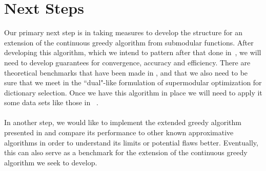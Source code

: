 \documentclass{article}
\begin{document}
\section{Next Steps}
Our primary next step is in taking measures to develop the structure for an extension of the continuous greedy algorithm from submodular functions. After developing this algorithm, which we intend to pattern after that done in~\cite{Singer16TwoStage}, we will need to develop guarantees for convergence, accuracy and efficiency. There are theoretical benchmarks that have been made in \cite{greedy_selection}, \cite{Krause05near-optimalnonmyopic} and \cite{nonconvexrelax} that we also need to be sure that we meet in the ``dual"-like formulation of supermodular optimization for dictionary selection. Once we have this algorithm in place we will need to apply it some data sets like those in ~\cite{Singer16TwoStage}.
\\
\\
In another step, we would like to implement the extended greedy algorithm presented in \cite{BoutsidisLS15} and compare its performance to other known approximative algorithms in order to understand its limits or potential flaws better. Eventually, this can also serve as a benchmark for the extension of the continuous greedy algorithm we seek to develop.



\end{document}
